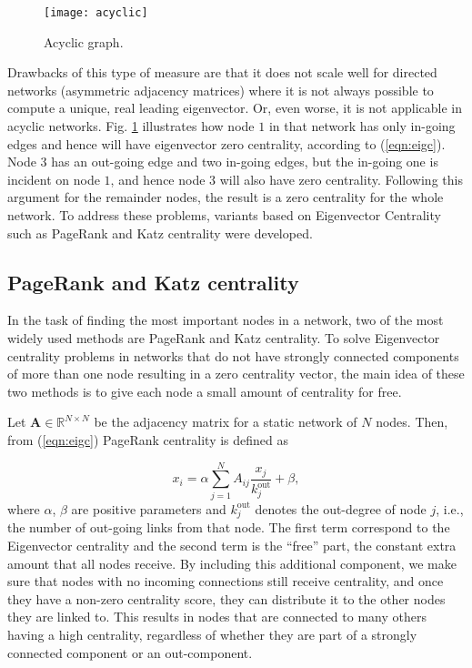 \begin{figure}[h]\centering
	\texttt{[image: acyclic]}
	\caption{Acyclic graph.}
	\label{fig:acyclic}
	\bigskip
\end{figure}

Drawbacks of this type of measure are that it does not scale well for directed networks (asymmetric adjacency matrices) where it is not always possible to compute a unique, real leading eigenvector. Or, even worse, it is not applicable in acyclic networks. Fig. \ref{fig:acyclic} illustrates how node $1$ in that network has only in-going edges and hence will have eigenvector zero centrality, according to (\ref{eqn:eigc}). Node $3$ has an out-going edge and two in-going edges, but the in-going one is incident on node $1$, and hence node $3$ will also have zero centrality. Following this argument for the remainder nodes, the result is a zero centrality for the whole network. To address these problems, variants based on Eigenvector Centrality such as PageRank and Katz centrality were developed.

\subsection*{PageRank and Katz centrality}
In the task of finding the most important nodes in a network, two of the most widely used methods are PageRank and Katz centrality. To solve Eigenvector centrality problems in networks that do not have strongly connected components of more than one node resulting in a zero centrality vector, the main idea of these two methods is to give each node a small amount of centrality for free. 

Let $\mathbf{A}\in\mathbb{R}^{N\times N}$ be the adjacency matrix for a static network of $N$ nodes. Then, from (\ref{eqn:eigc}) PageRank centrality is defined as

\begin{equation}
\label{eqn:pr1}
    x_i= \alpha\sum_{j=1}^{N}A_{ij}\frac{x_j}{k_j^{\text{out}}} + \beta,
\end{equation}
where $\alpha$, $\beta$ are positive parameters and $k_j^{\text{out}}$ denotes the out-degree of node $j$, i.e., the number of out-going links from that node. The first term correspond to the Eigenvector centrality and the second term is the “free” part, the constant extra amount that all nodes receive. By including this additional component, we make sure that nodes with no incoming connections still receive centrality, and once they have a non-zero centrality score, they can distribute it to the other nodes they are linked to. This results in nodes that are connected to many others having a high centrality, regardless of whether they are part of a strongly connected component or an out-component.

